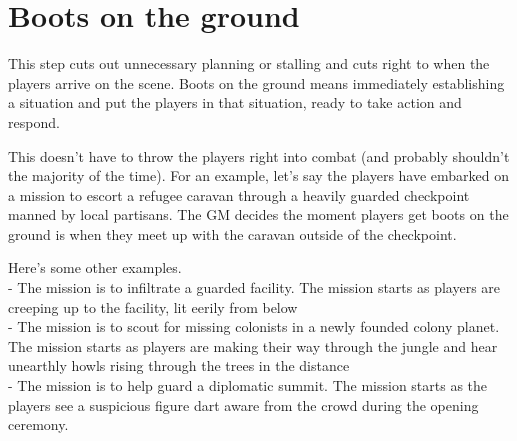 \section{Boots on the ground}

This step cuts out unnecessary planning or stalling and cuts right to when the players arrive on the scene. Boots on the ground means immediately establishing a situation and put the players in that situation, ready to take action and respond. 

This doesn’t have to throw the players right into combat (and probably shouldn’t the majority of the time). For an example, let’s say the players have embarked on a mission to escort a refugee caravan through a heavily guarded checkpoint manned by local partisans. The GM decides the moment players get boots on the ground is when they meet up with the caravan outside of the checkpoint. 

Here’s some other examples.\\
- The mission is to infiltrate a guarded facility. The mission starts as players are creeping up to the facility, lit eerily from below\\
- The mission is to scout for missing colonists in a newly founded colony planet. The mission starts as players are making their way through the jungle and hear unearthly howls rising through the trees in the distance\\
- The mission is to help guard a diplomatic summit. The mission starts as the players see a suspicious figure dart aware from the crowd during the opening ceremony.